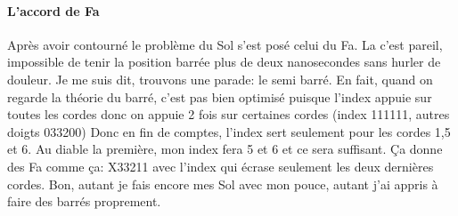 \documentclass[a4paper]{article}
\begin{document}
\paragraph{L'accord de Fa}
Après avoir contourné le problème du Sol s'est posé celui du Fa. La
c'est pareil, impossible de tenir la position barrée plus de deux
nanosecondes sans hurler de douleur.  Je me suis dit, trouvons une parade:
le semi barré.  En fait, quand on regarde la théorie du barré, c'est
pas bien optimisé puisque l'index appuie sur toutes les cordes donc on
appuie 2 fois sur certaines cordes (index 111111, autres doigts 033200)
Donc en fin de comptes, l'index sert seulement pour les cordes 1,5 et
6. Au diable la première, mon index fera 5 et 6 et ce sera suffisant.
Ça donne des Fa comme ça: X33211 avec l'index qui écrase seulement les
deux dernières cordes. Bon, autant je fais encore mes Sol avec mon
pouce, autant j'ai appris à faire des barrés proprement.
\end{document}
